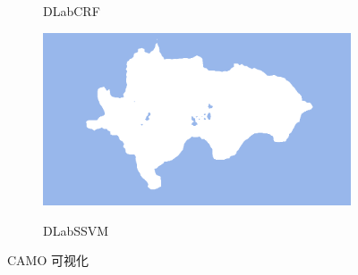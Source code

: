 \documentclass[a4paper,12pt]{ctexart}
\begin{document}
\begin{figure}[h!]
\begin{subfigure}{0.25\textwidth}
        \label{fig:demo1_crf}
        \caption{DLabCRF}
    \end{subfigure}%
    \hfill
    \begin{subfigure}{0.25\textwidth}
        \centering
        \includegraphics[width=\linewidth]{figures/CAMO_demo1/CAMO_demo1_pred_dlap.png}
        \label{fig:demo1_ssvm}
        \caption{DLabSSVM}
    \end{subfigure}

    \caption{CAMO 可视化 \label{fig:CAMO_demo1}}
\end{figure}
\end{document}
